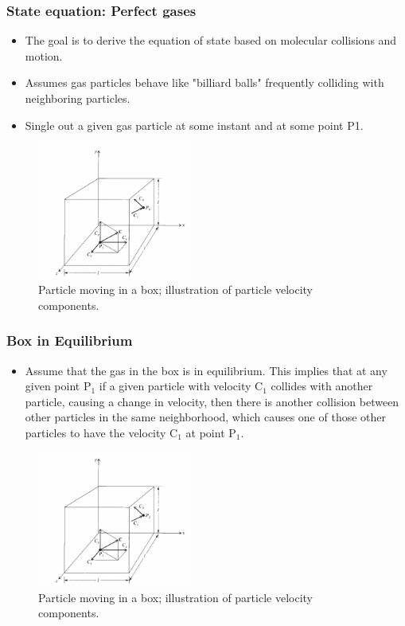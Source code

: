 \documentclass{beamer}
\begin{document}
\begin{frame}
\frametitle{State equation: Perfect gases}
\begin{itemize}

    \item The goal is to derive the equation of state based on molecular collisions and motion.
    \item Assumes gas particles behave like "billiard balls" frequently colliding with neighboring particles.
    \item Single out a given gas particle at some instant and at some point P1.
  
\end{itemize}
\vskip-0.25cm
\begin{figure}
        \centering
        \includegraphics[width=0.45\textwidth]{box.png}
        \caption{Particle moving in a box; illustration of particle velocity components.}
    \end{figure}
\end{frame}

\begin{frame}
\frametitle{Box in Equilibrium}
\begin{itemize}

    \item Assume that the gas in the box
is in equilibrium. This implies that at any given point P$_1$ if a given particle with
velocity C$_1$ collides with another particle, causing a change in velocity, then there
is another collision between other particles in the same neighborhood, which
causes one of those other particles to have the velocity C$_1$ at point P$_1$.
  
\end{itemize}
\vskip-0.25cm
\begin{figure}
        \centering
        \includegraphics[width=0.45\textwidth]{box.png}
        \caption{Particle moving in a box; illustration of particle velocity components.}
    \end{figure}
\end{frame}
\end{document}
